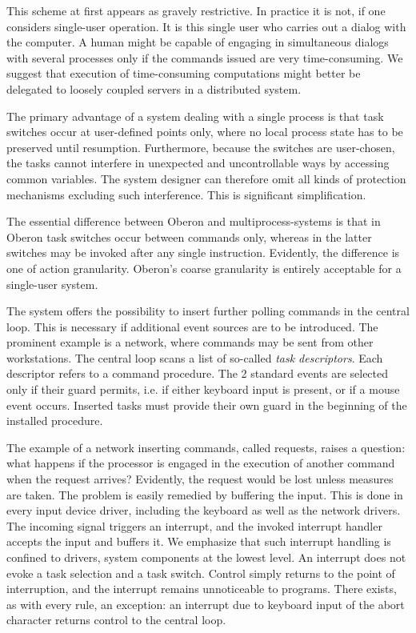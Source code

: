 This scheme at first appears as gravely restrictive. In practice it is not, if one considers
single-user operation. It is this single user who carries out a dialog with the computer.
A human might be capable of engaging in simultaneous dialogs with several processes only if
the commands issued are very time-consuming. We suggest that execution of time-consuming
computations might better be delegated to loosely coupled servers in a distributed system.

The primary advantage of a system dealing with a single process is that task switches occur
at user-defined points only, where no local process state has to be preserved until resumption.
Furthermore, because the switches are user-chosen, the tasks cannot interfere in unexpected
and uncontrollable ways by accessing common variables. The system designer can therefore omit
all kinds of protection mechanisms excluding such interference. This is significant simplification.

The essential difference between Oberon and multiprocess-systems is that in Oberon task
switches occur between commands only, whereas in the latter switches may be invoked after
any single instruction. Evidently, the difference is one of action granularity. Oberon's
coarse granularity is entirely acceptable for a single-user system.

The system offers the possibility to insert further polling commands in the central loop.
This is necessary if additional event sources are to be introduced. The prominent example
is a network, where commands may be sent from other workstations. The central loop scans
a list of so-called \emph{task descriptors}. Each descriptor refers to a command procedure.
The 2 standard events are selected only if their guard permits, i.e. if either keyboard
input is present, or if a mouse event occurs. Inserted tasks must provide their own guard
in the beginning of the installed procedure.

The example of a network inserting commands, called requests, raises a question: what happens
if the processor is engaged in the execution of another command when the request arrives?
Evidently, the request would be lost unless measures are taken. The problem is easily remedied
by buffering the input. This is done in every input device driver, including the keyboard
as well as the network drivers. The incoming signal triggers an interrupt, and the invoked
interrupt handler accepts the input and buffers it. We emphasize that such interrupt handling
is confined to drivers, system components at the lowest level. An interrupt does not evoke
a task selection and a task switch. Control simply returns to the point of interruption, and
the interrupt remains unnoticeable to programs. There exists, as with every rule, an exception:
an interrupt due to keyboard input of the abort character returns control to the central loop.


